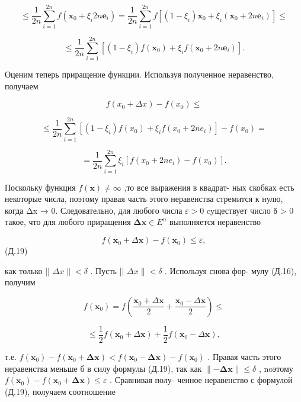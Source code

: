\documentclass[8pt]{extarticle}
\begin{document}
\[
\leq  \frac{1}{2n}\mathop{\sum }\limits_{{i = 1}}^{{2n}}f\left( {{\mathbf{x}}_{0} + {\xi }_{i}{2n}{\mathbf{e}}_{i}}\right)  = \frac{1}{2n}\mathop{\sum }\limits_{{i = 1}}^{{2n}}f\left\lbrack  {\left( {1 - {\xi }_{i}}\right) {\mathbf{x}}_{0} + {\xi }_{i}\left( {{\mathbf{x}}_{0} + {2n}{\mathbf{e}}_{i}}\right) }\right\rbrack   \leq
\]

\[
\leq  \frac{1}{2n}\mathop{\sum }\limits_{{i = 1}}^{{2n}}\left\lbrack  {\left( {1 - {\xi }_{i}}\right) f\left( {\mathbf{x}}_{0}\right)  + {\xi }_{i}f\left( {{\mathbf{x}}_{0} + {2n}{\mathbf{e}}_{i}}\right) }\right\rbrack  .
\]

Оценим теперь приращение функции. Используя полученное неравенство, получаем

\[
f\left( {{x}_{0} + {\Delta x}}\right)  - f\left( {x}_{0}\right)  \leq
\]

\[
\leq  \frac{1}{2n}\mathop{\sum }\limits_{{i = 1}}^{{2n}}\left\lbrack  {\left( {1 - {\xi }_{i}}\right) f\left( {x}_{0}\right)  + {\xi }_{i}f\left( {{x}_{0} + {2n}{e}_{i}}\right) }\right\rbrack   - f\left( {x}_{0}\right)  =
\]

\[
= \frac{1}{2n}\mathop{\sum }\limits_{{i = 1}}^{{2n}}{\xi }_{i}\left\lbrack  {f\left( {{x}_{0} + {2n}{e}_{i}}\right)  - f\left( {x}_{0}\right) }\right\rbrack  .
\]

Поскольку функция \(f\left( \mathbf{x}\right)  \neq  \infty\) ,то все выражения в квадрат- ных скобках есть некоторые числа, поэтому правая часть этого неравенства стремится к нулю, когда Δx → 0. Следовательно, для любого числа \(\varepsilon  > 0\) cyществует число δ > 0 такое, что для любого приращения \(\mathbf{{\Delta x}} \in  {E}^{n}\) выполняется неравенство

\[
f\left( {{\mathbf{x}}_{0} + \Delta \mathbf{x}}\right)  - f\left( {\mathbf{x}}_{0}\right)  \leq  \varepsilon ,
\]
 (Д.19)

как только || \({\Delta x} \parallel   < \delta\) . Пусть || \({\Delta x} \parallel   < \delta\) . Используя снова фор- мулу (Д.16), получим

\[
f\left( {\mathbf{x}}_{0}\right)  = f\left( {\frac{{\mathbf{x}}_{0} + \Delta \mathbf{x}}{2} + \frac{{\mathbf{x}}_{0} - \Delta \mathbf{x}}{2}}\right)  \leq
\]

\[
\leq  \frac{1}{2}f\left( {{\mathbf{x}}_{0} + \Delta \mathbf{x}}\right)  + \frac{1}{2}f\left( {{\mathbf{x}}_{0} - \Delta \mathbf{x}}\right) ,
\]

т.е. \(f\left( {\mathbf{x}}_{0}\right)  - f\left( {{\mathbf{x}}_{0} + \mathbf{{\Delta x}}}\right)  < f\left( {{\mathbf{x}}_{0} - \mathbf{{\Delta x}}}\right)  - f\left( {\mathbf{x}}_{0}\right)\) . Правая часть этого неравенства меньше б в силу формулы (Д.19), так как \(\parallel  - \mathbf{\Delta }\mathbf{x}\parallel  \leq  \delta\) , noэтому \(f\left( {\mathbf{x}}_{0}\right)  - f\left( {{\mathbf{x}}_{0} + \mathbf{\Delta }\mathbf{x}}\right)  \leq  \varepsilon\) . Сравнивая полу- ченное неравенство с формулой (Д.19), получаем соотношение
\end{document}
